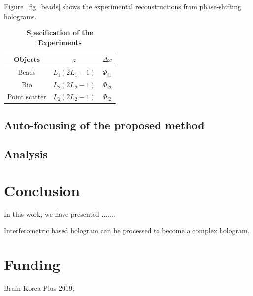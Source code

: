 \documentclass[9pt,twocolumn,twoside]{osajnl}
\begin{document}
Figure~\ref{fig_beads} shows the experimental reconstructions from phase-shifting holograms.


\begin{table}[H]
\centering
\caption{\bf Specification of the Experiments}
\begin{tabular}{ccc}
\hline
Objects & $z$         & $\Delta x$ \\
\hline
Beads & $L_1(2L_1-1)$ & $\Phi_{i1}$ \\
Bio   & $L_2(2L_2-1)$ & $\Phi_{i2}$ \\
Point scatter  & $L_2(2L_2-1)$ & $\Phi_{i2}$ \\
\hline
\end{tabular}
\label{tb_expspec}
\end{table}

\subsection{Auto-focusing of the proposed method}

\subsection{Analysis}


\section{Conclusion}

In this work, we have presented .......

Interferometric based hologram can be processed to become a complex hologram.


\section{Funding}

Brain Korea Plus 2019; 




\end{document}
